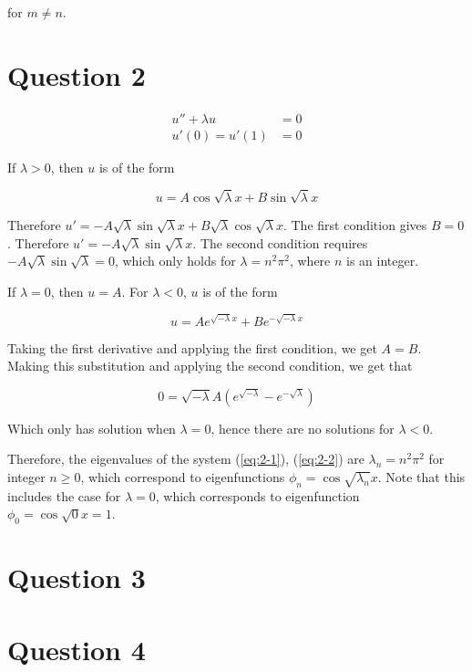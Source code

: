 \documentclass{article}
\begin{document}
for $m \neq n$.

\section*{Question 2}

\begin{align}
    u'' + \lambda u &= 0 \label{eq:2-1}\\
    u'(0) = u'(1) &= 0 \label{eq:2-2}
\end{align}

If $\lambda > 0$, then $u$ is of the form

\begin{equation*}
    u = A\cos\sqrt{\lambda}x + B\sin\sqrt{\lambda}x
\end{equation*}

Therefore $u' = -A\sqrt{\lambda}\sin\sqrt{\lambda}x + B\sqrt{\lambda}\cos\sqrt{\lambda}x$.
The first condition gives $B = 0$. Therefore $u' = -A\sqrt{\lambda}\sin\sqrt{\lambda}x$. The
second condition requires $-A\sqrt{\lambda}\sin\sqrt{\lambda} = 0$, which only holds for
$\lambda = n^2\pi^2$, where $n$ is an integer.

\hfill\break
If $\lambda = 0$, then $u = A$. For $\lambda < 0$, $u$ is of the form

\begin{equation*}
    u = Ae^{\sqrt{-\lambda}x} + Be^{-\sqrt{-\lambda}x}
\end{equation*}

Taking the first derivative and applying the first condition, we get $A = B$.
Making this substitution and applying the second condition, we get that

\begin{equation*}
    0 = \sqrt{-\lambda}A(e^{\sqrt{-\lambda}} - e^{-\sqrt{\lambda}})
\end{equation*}

Which only has solution when $\lambda = 0$, hence there are no solutions for $\lambda < 0$.

\hfill\break
Therefore, the eigenvalues of the system (\ref{eq:2-1}), (\ref{eq:2-2}) are
$\lambda_n = n^2\pi^2$ for integer $n \geq 0$, which correspond to eigenfunctions
$\phi_n = \cos\sqrt{\lambda_n}x$. Note that this includes the case for $\lambda = 0$, which
corresponds to eigenfunction $\phi_0 = \cos\sqrt{0}x = 1$.

\section*{Question 3}

\section*{Question 4}
\end{document}
